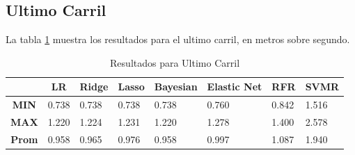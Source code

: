 \subsection{Ultimo Carril}

La tabla \ref{tab:resultadosScikitUltimoCarril} muestra los resultados para el ultimo carril, en metros sobre segundo.


\begin{table}[H]
    \centering
    \caption{Resultados para Ultimo Carril}
    \label{tab:resultadosScikitUltimoCarril}
    \begin{tabular}{|c|l|l|l|l|l|l|l|} \hline
        & \multicolumn{1}{c|}{\textbf{LR}} & \multicolumn{1}{c|}{\textbf{Ridge}} & \multicolumn{1}{c|}{\textbf{Lasso}} & \multicolumn{1}{c|}{\textbf{Bayesian}} & \multicolumn{1}{c|}{\textbf{Elastic Net}} & \multicolumn{1}{c|}{\textbf{RFR}} & \multicolumn{1}{c|}{\textbf{SVMR}} \\ \hline

        \textbf{MIN} & 0.738 & 0.738 & 0.738 & 0.738 & 0.760 & 0.842 & 1.516 \\ \hline
        \textbf{MAX} & 1.220 & 1.224 & 1.231 & 1.220 & 1.278 & 1.400 & 2.578 \\ \hline
        \textbf{Prom} & 0.958 & 0.965 & 0.976 & 0.958 & 0.997 & 1.087 & 1.940 \\ \hline
    \end{tabular}
\end{table}

